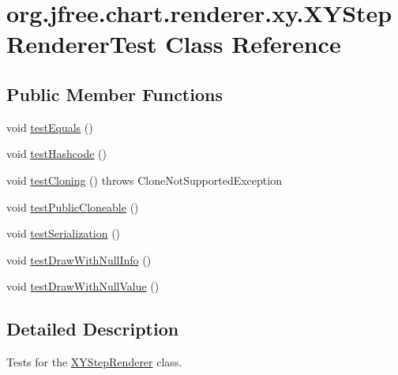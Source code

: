 \hypertarget{classorg_1_1jfree_1_1chart_1_1renderer_1_1xy_1_1_x_y_step_renderer_test}{}\section{org.\+jfree.\+chart.\+renderer.\+xy.\+X\+Y\+Step\+Renderer\+Test Class Reference}
\label{classorg_1_1jfree_1_1chart_1_1renderer_1_1xy_1_1_x_y_step_renderer_test}
\subsection*{Public Member Functions}
\begin{DoxyCompactItemize}
\item 
void \mbox{\hyperlink{classorg_1_1jfree_1_1chart_1_1renderer_1_1xy_1_1_x_y_step_renderer_test_a8544526adcca0bf3475c522ba0291a58}{test\+Equals}} ()
\item 
void \mbox{\hyperlink{classorg_1_1jfree_1_1chart_1_1renderer_1_1xy_1_1_x_y_step_renderer_test_a024bf09256506cb5b8a928b5f94b4ce5}{test\+Hashcode}} ()
\item 
void \mbox{\hyperlink{classorg_1_1jfree_1_1chart_1_1renderer_1_1xy_1_1_x_y_step_renderer_test_a6bf12b58e34dc526faf13ab47bcf6a57}{test\+Cloning}} ()  throws Clone\+Not\+Supported\+Exception 
\item 
void \mbox{\hyperlink{classorg_1_1jfree_1_1chart_1_1renderer_1_1xy_1_1_x_y_step_renderer_test_a3da7d5a66c946a496de7f7f6d23fb770}{test\+Public\+Cloneable}} ()
\item 
void \mbox{\hyperlink{classorg_1_1jfree_1_1chart_1_1renderer_1_1xy_1_1_x_y_step_renderer_test_a14ab1568bfd8b695de136a7b7456e433}{test\+Serialization}} ()
\item 
void \mbox{\hyperlink{classorg_1_1jfree_1_1chart_1_1renderer_1_1xy_1_1_x_y_step_renderer_test_ae6f9344999114de2adf21bdbbc19e291}{test\+Draw\+With\+Null\+Info}} ()
\item 
void \mbox{\hyperlink{classorg_1_1jfree_1_1chart_1_1renderer_1_1xy_1_1_x_y_step_renderer_test_a030e8de512a21ac7a70e93a210d6769d}{test\+Draw\+With\+Null\+Value}} ()
\end{DoxyCompactItemize}


\subsection{Detailed Description}
Tests for the \mbox{\hyperlink{classorg_1_1jfree_1_1chart_1_1renderer_1_1xy_1_1_x_y_step_renderer}{X\+Y\+Step\+Renderer}} class. 

